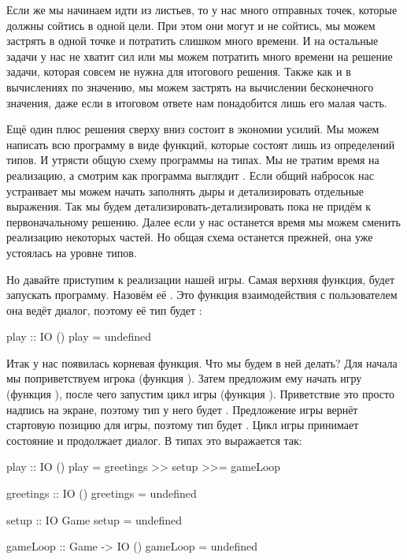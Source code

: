 

Если же мы начинаем идти из листьев, то у нас много отправных
точек, которые должны сойтись в одной цели. При этом они
могут и не сойтись, мы можем застрять в одной точке и потратить
слишком много времени. И на остальные задачи у нас не хватит
сил или мы можем потратить много времени на решение задачи,
которая совсем не нужна для итогового решения. Также как и в 
вычислениях по значению, мы можем застрять на вычислении 
бесконечного значения, даже если в итоговом ответе нам понадобится
лишь его малая часть. 

Ещё один плюс решения сверху вниз состоит в экономии усилий.
Мы можем написать всю программу в виде функций, которые 
состоят лишь из определений типов. И утрясти общую схему
программы на типах. Мы не тратим время на реализацию, а смотрим как
программа выглядит . Если общий набросок нас устраивает
мы можем начать заполнять дыры и детализировать отдельные
выражения. Так мы будем детализировать-детализировать 
пока не придём к первоначальному решению. Далее если у нас
останется время мы можем сменить реализацию некоторых частей. 
Но общая схема останется прежней, она уже устоялась на уровне
типов.

Но давайте приступим к реализации нашей игры. Самая
верхняя функция, будет запускать программу. Назовём её
. Это функция взаимодействия с пользователем 
она ведёт диалог, поэтому её тип будет \mbox{}:

\begin{code}
play :: IO ()
play = undefined
\end{code}

Итак у нас появилась корневая функция. Что мы будем
в ней делать? Для начала мы поприветствуем игрока
(функция ). Затем предложим ему начать игру
(функция ), после чего 
запустим цикл игры (функция ). Приветствие это просто надпись
на экране, поэтому тип у него будет . 
Предложение игры вернёт стартовую позицию для игры,
поэтому тип будет . Цикл игры принимает
состояние и продолжает диалог. В типах это выражается
так:

\begin{code}
play :: IO ()
play = greetings >> setup >>= gameLoop

greetings :: IO ()
greetings = undefined

setup :: IO Game
setup = undefined

gameLoop :: Game -> IO ()
gameLoop = undefined
\end{code}

